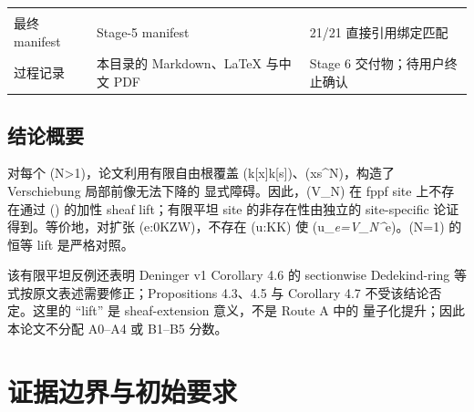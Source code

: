 \documentclass[12pt,a4paper]{article}
\begin{document}
\begin{longtable}[]{@{}lll@{}}
\begin{minipage}[t]{0.30\columnwidth}
\end{minipage}\tabularnewline
\begin{minipage}[t]{0.30\columnwidth}\raggedright
最终 manifest\strut
\end{minipage} & \begin{minipage}[t]{0.30\columnwidth}\raggedright
Stage-5 manifest\strut
\end{minipage} & \begin{minipage}[t]{0.30\columnwidth}\raggedright
21/21 直接引用绑定匹配\strut
\end{minipage}\tabularnewline
\begin{minipage}[t]{0.30\columnwidth}\raggedright
过程记录\strut
\end{minipage} & \begin{minipage}[t]{0.30\columnwidth}\raggedright
本目录的 Markdown、LaTeX 与中文 PDF\strut
\end{minipage} & \begin{minipage}[t]{0.30\columnwidth}\raggedright
Stage 6 交付物；待用户终止确认\strut
\end{minipage}\tabularnewline
\bottomrule
\end{longtable}

\hypertarget{ux7ed3ux8bbaux6982ux8981}{%
\subsection{结论概要}\label{ux7ed3ux8bbaux6982ux8981}}

对每个 (N\textgreater1)，论文利用有限自由根覆盖
(k{[}x{]}\to k{[}s{]})、(x\mapsto s\^{}N)，构造了 Verschiebung
局部前像无法下降的 显式障碍。因此，(V\_N) 在 fppf site 上不存在通过
(\omega) 的加性 sheaf lift；有限平坦 site 的非存在性由独立的
site-specific 论证得到。等价地，对扩张 (e:0\to K\to Z\to W)，不存在
(u:K\to K) 使 (u\_\emph{e=V\_N\^{}}e)。(N=1) 的恒等 lift 是严格对照。

该有限平坦反例还表明 Deninger v1 Corollary 4.6 的 sectionwise
Dedekind-ring 等式按原文表述需要修正；Propositions 4.3、4.5 与 Corollary
4.7 不受该结论否定。这里的 ``lift'' 是 sheaf-extension 意义，不是 Route
A 中的 量子化提升；因此本论文不分配 A0--A4 或 B1--B5 分数。

\hypertarget{ux8bc1ux636eux8fb9ux754cux4e0eux521dux59cbux8981ux6c42}{%
\section{证据边界与初始要求}\label{ux8bc1ux636eux8fb9ux754cux4e0eux521dux59cbux8981ux6c42}}
\end{document}
